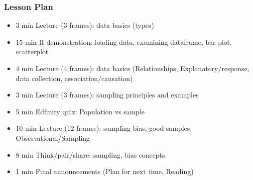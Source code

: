 \begin{frame}
    \frametitle{Lesson Plan}
    \begin{itemize}
        \item 3 min Lecture (3 frames): data basics (types)
        \item 15 min R demonstration: loading data, examining dataframe, bar plot, scatterplot
        \item 4 min Lecture (4 frames): data basics (Relationships, Explanatory/response, data collection, association/causation)
        \item 3 min Lecture (3 frames): sampling principles and examples
        \item 5 min Edfinity quiz: Population vs sample
        \item 10 min Lecture (12 frames): sampling bias, good samples, Observational/Sampling
        \item 8 min Think/pair/share: sampling, bias concepts
        \item 1 min Final announcements (Plan for next time, Reading)
    \end{itemize}
\end{frame}
    
